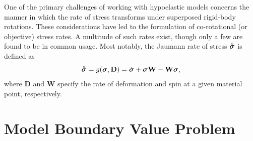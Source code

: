 One of the primary challenges of working with hypoelastic models concerns the manner in which the rate of stress transforms under superposed rigid-body rotations. These considerations have led to the formulation of co-rotational (or objective) stress rates. A multitude of such rates exist, though only a few are found to be in common usage. Most notably, the Jaumann rate of stress $\accentset{\circ}{\boldsymbol{\sigma}}$ is defined as
\begin{equation}
  \accentset{\circ}{\boldsymbol{\sigma}} = g (\boldsymbol{\sigma}, \mathbf{D}) = \dot{\boldsymbol{\sigma}} + \boldsymbol{\sigma} \mathbf{W} - \mathbf{W} \boldsymbol{\sigma},
\end{equation}
where $\mathbf{D}$ and $\mathbf{W}$ specify the rate of deformation and spin at a given material point, respectively.

%
%
%

\section{Model Boundary Value Problem}


